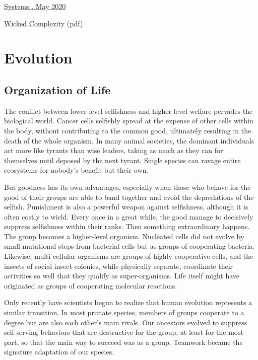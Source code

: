 \documentclass[
]{book}
\begin{document}
\href{https://www.mdpi.com/2079-8954/8/2/20?fbclid=IwAR1igNno1GlBpk86GkroiSCJuAZV_JnkPwwuzz5SmFTXINdRzX3nltifV1c}{Systems , May 2020}

\href{https://mahb.stanford.edu/blog/thresholds-cascades-and-wicked-problems/}{Wicked Complexity}
\href{pdf/Weyler_2020_Wicked_Problems.pdf}{(pdf)}

\hypertarget{evolution}{%
\chapter{Evolution}\label{evolution}}

\hypertarget{organization-of-life}{%
\section{Organization of Life}\label{organization-of-life}}

The conflict between lower-level selfishness and higher-level welfare pervades the biological world. Cancer cells selfishly spread at the expense of other cells within the body, without contributing to the common good, ultimately resulting in the death of the whole organism. In many animal societies, the dominant individuals act more like tyrants than wise leaders, taking as much as they can for themselves until deposed by the next tyrant. Single species can ravage entire ecosystems for nobody's benefit but their own.

But goodness has its own advantages, especially when those who behave for the good of their groups are able to band together and avoid the depredations of the selfish. Punishment is also a powerful weapon against selfishness, although it is often costly to wield. Every once in a great while, the good manage to decisively suppress selfishness within their ranks. Then something extraordinary happens. The group becomes a higher-level organism. Nucleated cells did not evolve by small mutational steps from bacterial cells but as groups of cooperating bacteria. Likewise, multi-cellular organisms are groups of highly cooperative cells, and the insects of social insect colonies, while physically separate, coordinate their activities so well that they qualify as super-organisms. Life itself might have originated as groups of cooperating molecular reactions.

Only recently have scientists begun to realize that human evolution represents a similar transition. In most primate species, members of groups cooperate to a degree but are also each other's main rivals. Our ancestors evolved to suppress self-serving behaviors that are destructive for the group, at least for the most part, so that the main way to succeed was as a group. Teamwork became the signature adaptation of our species.
\end{document}
